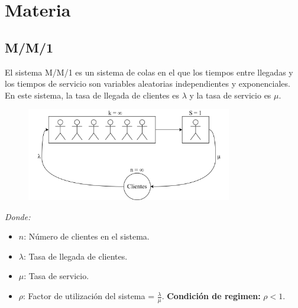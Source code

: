 \documentclass{templateNote}
\begin{document}

\portada
\margenes
\tableofcontents
\newpage




\section{Materia}
\subsection{M/M/1}
\noindent El sistema M/M/1 es un sistema de colas en el que los tiempos entre llegadas y los tiempos de servicio son variables aleatorias independientes y exponenciales. En este sistema, la tasa de llegada de clientes es $\lambda$ y la tasa de servicio es $\mu$. 

\begin{figure}[H]
    \centering
    \includegraphics[width=0.8\textwidth]{img/mm1.png}
\end{figure}

\textit{Donde:}
\begin{itemize}
    \item $n$: Número de clientes en el sistema.
    \item $\lambda$: Tasa de llegada de clientes.
    \item $\mu$: Tasa de servicio.
    \item $\rho$: Factor de utilización del sistema = $\frac{\lambda}{\mu}$. \textbf{Condición de regimen:} $\rho < 1$.
\end{itemize}
\end{document}
